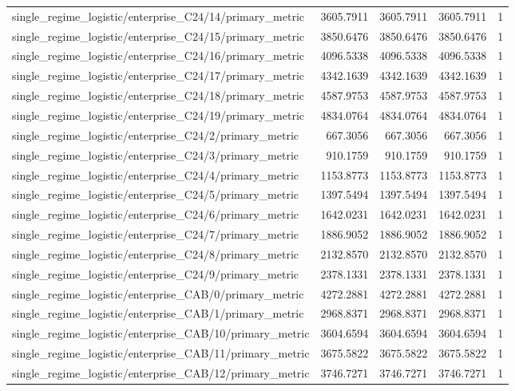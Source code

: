\begin{table}[h]
\begin{tabular}{lrrrr}
single_regime_logistic/enterprise_C24/14/primary_metric & 3605.7911 & 3605.7911 & 3605.7911 & 1 \\
single_regime_logistic/enterprise_C24/15/primary_metric & 3850.6476 & 3850.6476 & 3850.6476 & 1 \\
single_regime_logistic/enterprise_C24/16/primary_metric & 4096.5338 & 4096.5338 & 4096.5338 & 1 \\
single_regime_logistic/enterprise_C24/17/primary_metric & 4342.1639 & 4342.1639 & 4342.1639 & 1 \\
single_regime_logistic/enterprise_C24/18/primary_metric & 4587.9753 & 4587.9753 & 4587.9753 & 1 \\
single_regime_logistic/enterprise_C24/19/primary_metric & 4834.0764 & 4834.0764 & 4834.0764 & 1 \\
single_regime_logistic/enterprise_C24/2/primary_metric & 667.3056 & 667.3056 & 667.3056 & 1 \\
single_regime_logistic/enterprise_C24/3/primary_metric & 910.1759 & 910.1759 & 910.1759 & 1 \\
single_regime_logistic/enterprise_C24/4/primary_metric & 1153.8773 & 1153.8773 & 1153.8773 & 1 \\
single_regime_logistic/enterprise_C24/5/primary_metric & 1397.5494 & 1397.5494 & 1397.5494 & 1 \\
single_regime_logistic/enterprise_C24/6/primary_metric & 1642.0231 & 1642.0231 & 1642.0231 & 1 \\
single_regime_logistic/enterprise_C24/7/primary_metric & 1886.9052 & 1886.9052 & 1886.9052 & 1 \\
single_regime_logistic/enterprise_C24/8/primary_metric & 2132.8570 & 2132.8570 & 2132.8570 & 1 \\
single_regime_logistic/enterprise_C24/9/primary_metric & 2378.1331 & 2378.1331 & 2378.1331 & 1 \\
single_regime_logistic/enterprise_CAB/0/primary_metric & 4272.2881 & 4272.2881 & 4272.2881 & 1 \\
single_regime_logistic/enterprise_CAB/1/primary_metric & 2968.8371 & 2968.8371 & 2968.8371 & 1 \\
single_regime_logistic/enterprise_CAB/10/primary_metric & 3604.6594 & 3604.6594 & 3604.6594 & 1 \\
single_regime_logistic/enterprise_CAB/11/primary_metric & 3675.5822 & 3675.5822 & 3675.5822 & 1 \\
single_regime_logistic/enterprise_CAB/12/primary_metric & 3746.7271 & 3746.7271 & 3746.7271 & 1 \\

\end{tabular}
\end{table}

